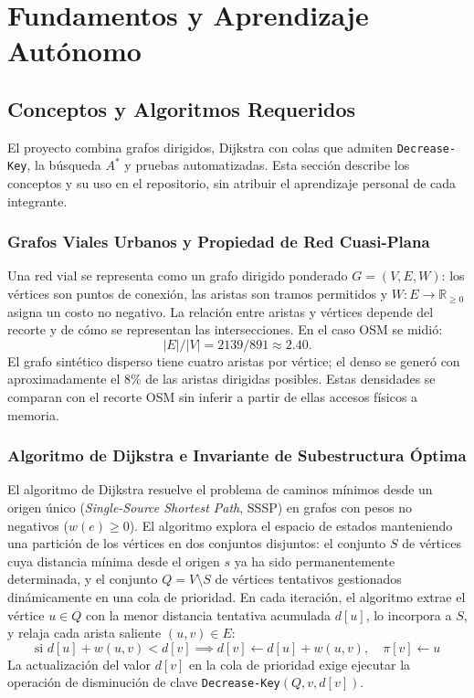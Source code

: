 \section{Fundamentos y Aprendizaje Autónomo}
\label{sec:fundamentos}

\subsection{Conceptos y Algoritmos Requeridos}
El proyecto combina grafos dirigidos, Dijkstra con colas que admiten \texttt{Decrease-Key}, la búsqueda $A^*$ y pruebas automatizadas. Esta sección describe los conceptos y su uso en el repositorio, sin atribuir el aprendizaje personal de cada integrante.

\subsubsection{Grafos Viales Urbanos y Propiedad de Red Cuasi-Plana}
Una red vial se representa como un grafo dirigido ponderado $G=(V,E,W)$: los vértices son puntos de conexión, las aristas son tramos permitidos y $W:E\to\mathbb{R}_{\ge 0}$ asigna un costo no negativo. La relación entre aristas y vértices depende del recorte y de cómo se representan las intersecciones. En el caso OSM se midió:
\begin{equation}
    |E|/|V| = 2139/891 \approx 2.40.
\end{equation}
El grafo sintético disperso tiene cuatro aristas por vértice; el denso se generó con aproximadamente el 8\% de las aristas dirigidas posibles. Estas densidades se comparan con el recorte OSM sin inferir a partir de ellas accesos físicos a memoria.

\subsubsection{Algoritmo de Dijkstra e Invariante de Subestructura Óptima}
El algoritmo de Dijkstra \parencite{dijkstra1959note} resuelve el problema de caminos mínimos desde un origen único (\textit{Single-Source Shortest Path}, SSSP) en grafos con pesos no negativos ($w(e) \ge 0$). El algoritmo explora el espacio de estados manteniendo una partición de los vértices en dos conjuntos disjuntos: el conjunto $S$ de vértices cuya distancia mínima desde el origen $s$ ya ha sido permanentemente determinada, y el conjunto $Q = V \setminus S$ de vértices tentativos gestionados dinámicamente en una cola de prioridad. En cada iteración, el algoritmo extrae el vértice $u \in Q$ con la menor distancia tentativa acumulada $d[u]$, lo incorpora a $S$, y relaja cada arista saliente $(u, v) \in E$:
\begin{equation}
    \text{si } d[u] + w(u, v) < d[v] \implies d[v] \leftarrow d[u] + w(u, v), \quad \pi[v] \leftarrow u
\end{equation}
La actualización del valor $d[v]$ en la cola de prioridad exige ejecutar la operación de disminución de clave \texttt{Decrease-Key}$(Q, v, d[v])$.

